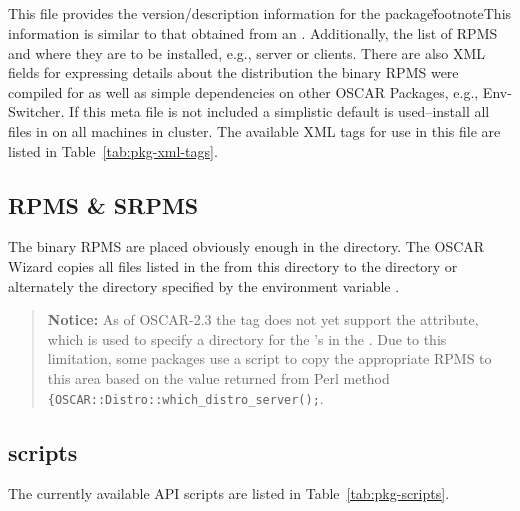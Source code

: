 \subsection{}

This file provides the version/description information for the
package\~footnote{This information is similar to that obtained from an
}.  Additionally, the list of RPMS
and where they are to be installed, e.g., server or clients.  There are
also XML fields for expressing details about the distribution the binary
RPMS were compiled for as well as simple dependencies on other OSCAR
Packages, e.g., Env-Switcher.  If this meta file is not included a
simplistic default is used--install all files in  on all
machines in cluster.  The available XML tags for use in this file are
listed in Table~\ref{tab:pkg-xml-tags}.





\subsection{RPMS \& SRPMS}

The binary RPMS are placed obviously enough in the 
directory.  The OSCAR Wizard copies all files listed in the  
from this  directory to the  directory 
or alternately the directory specified by the environment variable 
. 

\begin{verse}
   {\bfseries Notice: } As of OSCAR-2.3 the  tag does not yet
   support the  attribute, which is used to specify a
   directory for the 's in the .  Due to this
   limitation, some packages use a  script to copy the
   appropriate RPMS to this  area based on the value
   returned from Perl method \verb={OSCAR::Distro::which_distro_server();=.
\end{verse}



\subsection{scripts}

The currently available API scripts are listed in Table~\ref{tab:pkg-scripts}.




